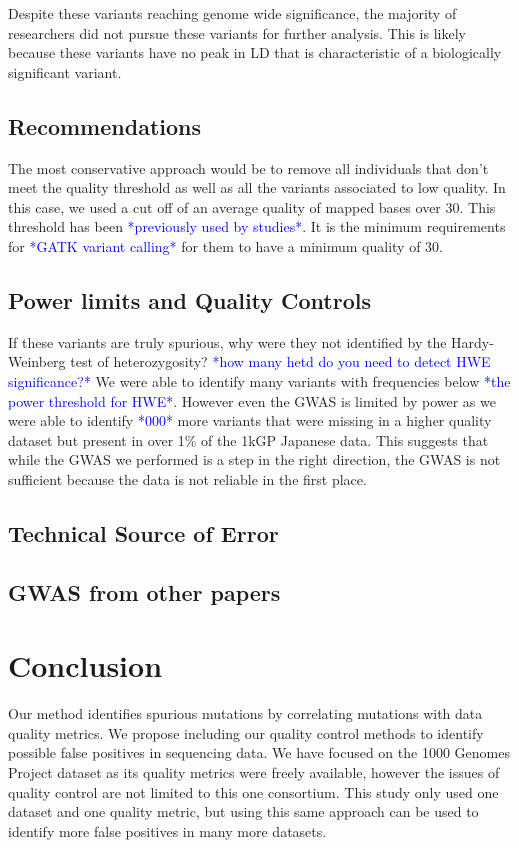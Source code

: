 \documentclass[9pt,lineno]{elife}
\newcommand{\todo}[1]{\textcolor{blue}{*#1*}}
\begin{document}
Despite these variants reaching genome wide significance, the majority of researchers did not pursue these variants for further analysis.
This is likely because these variants have no peak in LD that is characteristic of a biologically significant variant.

\subsection{Recommendations}
The most conservative approach would be to remove all individuals that don't meet the quality threshold as well as all the variants associated to low quality.
In this case, we used a cut off of an average quality of mapped bases over 30. This threshold has been \todo{previously used by studies}. It is the minimum requirements for \todo{GATK variant calling} for them to have a minimum quality of 30.

\subsection{Power limits and Quality Controls}
If these variants are truly spurious, why were they not identified by the Hardy-Weinberg test of heterozygosity?
\todo{how many hetd do you need to detect HWE significance?}
We were able to identify many variants with frequencies below \todo{the power threshold for HWE}.
However even the GWAS is limited by power as we were able to identify \todo{000} more variants that were missing in a higher quality dataset but present in over 1\% of the 1kGP Japanese data. 
This suggests that while the GWAS we performed is a step in the right direction, the GWAS is not sufficient because the data is not reliable in the first place. 

\subsection{Technical Source of Error}

\subsection{GWAS from other papers}


			\section{Conclusion}
Our method identifies spurious mutations by correlating mutations with data quality metrics. 
We propose including our quality control methods to identify possible false positives in sequencing data. 
We have focused on the 1000 Genomes Project dataset as its quality metrics were freely available, however the issues of quality control are not limited to this one consortium. 
This study only used one dataset and one quality metric, but using this same approach can be used to identify more false positives in many more datasets. 
\end{document}
